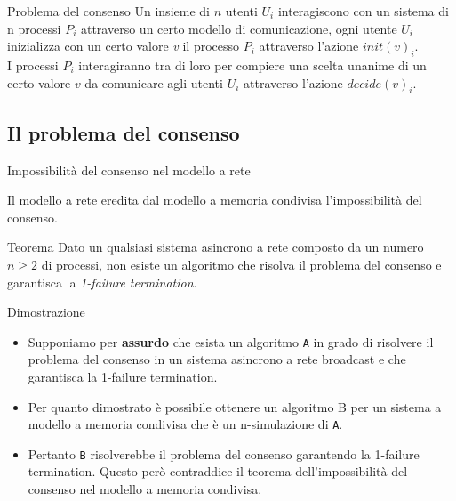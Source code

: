 \documentclass{beamer}
\begin{document}
    \begin{frame}{Problema del consenso}
        Un insieme di $n$ utenti $U_{i}$ interagiscono con un sistema di n processi $P_{i}$ attraverso un certo modello di comunicazione, ogni utente $U_{i}$ inizializza con un certo valore \textit{v} il processo $P_{i}$ attraverso l'azione $init(v)_{i}$.
        \\[10pt]
        I processi $P_{i}$ interagiranno tra di loro per compiere una scelta unanime di un certo valore $v$ da comunicare agli utenti $U_{i}$ attraverso l'azione $decide(v)_{i}$.

    \end{frame}

    \subsection{Il problema del consenso}

    \begin{frame}{Impossibilità del consenso nel modello a rete}

        Il modello a rete eredita dal modello a memoria condivisa l'impossibilità del consenso.

        \begin{block}{Teorema}
            Dato un qualsiasi sistema asincrono a rete composto da un numero $n \geq 2$ di processi, non esiste un algoritmo che risolva il problema del consenso e garantisca la \textit{1-failure termination}.
        \end{block}
    \end{frame}

    \begin{frame}{Dimostrazione}
        \begin{itemize}
            \item Supponiamo per \textbf{assurdo} che esista un algoritmo \texttt{A} in grado di risolvere il problema del consenso in un sistema asincrono a rete broadcast e che garantisca la 1-failure termination.
            \item Per quanto dimostrato è possibile ottenere un algoritmo B per un sistema a modello a memoria condivisa che è un n-simulazione di \texttt{A}.
            \item Pertanto \texttt{B} risolverebbe il problema del consenso garantendo la 1-failure termination. Questo però contraddice il teorema dell'impossibilità del consenso nel modello a memoria condivisa.
        \end{itemize}
    \end{frame}
\end{document}

